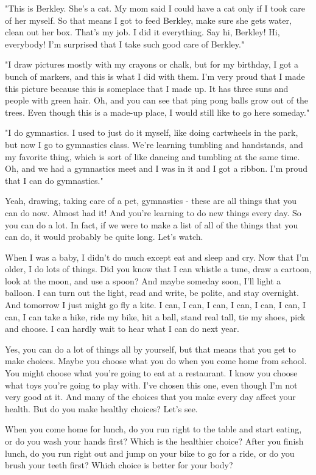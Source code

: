 "This is Berkley. She's a cat. My mom said I could have a cat only if I took care of her myself. So that means I got to feed Berkley, make sure she gets water, clean out her box. That's my job. I did it everything. Say hi, Berkley! Hi, everybody! I'm surprised that I take such good care of Berkley."

"I draw pictures mostly with my crayons or chalk, but for my birthday, I got a bunch of markers, and this is what I did with them. I'm very proud that I made this picture because this is someplace that I made up. It has three suns and people with green hair. Oh, and you can see that ping pong balls grow out of the trees. Even though this is a made-up place, I would still like to go here someday."

"I do gymnastics. I used to just do it myself, like doing cartwheels in the park, but now I go to gymnastics class. We're learning tumbling and handstands, and my favorite thing, which is sort of like dancing and tumbling at the same time. Oh, and we had a gymnastics meet and I was in it and I got a ribbon. I'm proud that I can do gymnastics."

Yeah, drawing, taking care of a pet, gymnastics - these are all things that you can do now. Almost had it! And you're learning to do new things every day. So you can do a lot. In fact, if we were to make a list of all of the things that you can do, it would probably be quite long. Let's watch.

When I was a baby, I didn't do much except eat and sleep and cry. Now that I'm older, I do lots of things. Did you know that I can whistle a tune, draw a cartoon, look at the moon, and use a spoon? And maybe someday soon, I'll light a balloon. I can turn out the light, read and write, be polite, and stay overnight. And tomorrow I just might go fly a kite. I can, I can, I can, I can, I can, I can, I can, I can take a hike, ride my bike, hit a ball, stand real tall, tie my shoes, pick and choose. I can hardly wait to hear what I can do next year.

Yes, you can do a lot of things all by yourself, but that means that you get to make choices. Maybe you choose what you do when you come home from school. You might choose what you're going to eat at a restaurant. I know you choose what toys you're going to play with. I've chosen this one, even though I'm not very good at it. And many of the choices that you make every day affect your health. But do you make healthy choices? Let's see.

When you come home for lunch, do you run right to the table and start eating, or do you wash your hands first? Which is the healthier choice? After you finish lunch, do you run right out and jump on your bike to go for a ride, or do you brush your teeth first? Which choice is better for your body?

